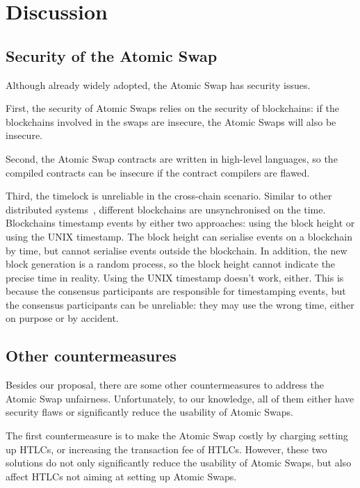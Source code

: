 \section{Discussion}
\label{sec:discussion}

\subsection{Security of the Atomic Swap}

Although already widely adopted, the Atomic Swap has security issues.

First, the security of Atomic Swaps relies on the security of blockchains:
if the blockchains involved in the swaps are insecure, the Atomic Swaps will also be insecure.

Second, the Atomic Swap contracts are written in high-level languages, so the compiled contracts can be insecure if the contract compilers are flawed.

Third, the timelock is unreliable in the cross-chain scenario.
Similar to other distributed systems~\cite{coulouris2012distributed}, different blockchains are unsynchronised on the time.
Blockchains timestamp events by either two approaches: using the block height or using the UNIX timestamp.
The block height can serialise events on a blockchain by time, but cannot serialise events outside the blockchain.
In addition, the new block generation is a random process, so the block height cannot indicate the precise time in reality.
Using the UNIX timestamp doesn't work, either.
This is because the consensus participants are responsible for timestamping events, but the consensus participants can be unreliable:
they may use the wrong time, either on purpose or by accident.


\subsection{Other countermeasures}

Besides our proposal, there are some other countermeasures to address the Atomic Swap unfairness.
Unfortunately, to our knowledge, all of them either have security flaws or significantly reduce the usability of Atomic Swaps.

The first countermeasure is to make the Atomic Swap costly by charging setting up HTLCs, or increasing the transaction fee of HTLCs.
However, these two solutions do not only significantly reduce the usability of Atomic Swaps, but also affect HTLCs not aiming at setting up Atomic Swaps.

